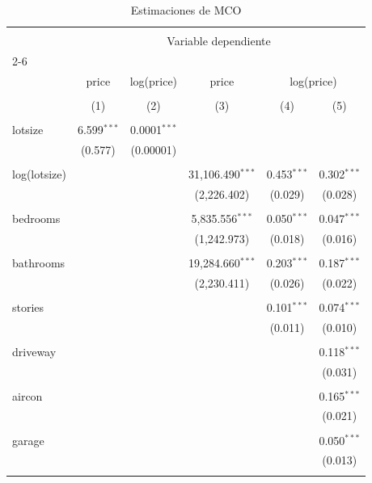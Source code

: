 
\begin{table}[H] \centering 
  \caption{Estimaciones de MCO} 
  \label{tab:tabla2} 
\begin{tabular}{@{\extracolsep{5pt}}lccccc} 
\\[-1.8ex]\hline 
\hline \\[-1.8ex] 
 & \multicolumn{5}{c}{Variable dependiente} \\ 
\cline{2-6} 
\\[-1.8ex] & price & log(price) & price & \multicolumn{2}{c}{log(price)} \\ 
\\[-1.8ex] & (1) & (2) & (3) & (4) & (5)\\ 
\hline \\[-1.8ex] 
 lotsize & 6.599$^{***}$ & 0.0001$^{***}$ &  &  &  \\ 
  & (0.577) & (0.00001) &  &  &  \\ 
  & & & & & \\ 
 log(lotsize) &  &  & 31,106.490$^{***}$ & 0.453$^{***}$ & 0.302$^{***}$ \\ 
  &  &  & (2,226.402) & (0.029) & (0.028) \\ 
  & & & & & \\ 
 bedrooms &  &  & 5,835.556$^{***}$ & 0.050$^{***}$ & 0.047$^{***}$ \\ 
  &  &  & (1,242.973) & (0.018) & (0.016) \\ 
  & & & & & \\ 
 bathrooms &  &  & 19,284.660$^{***}$ & 0.203$^{***}$ & 0.187$^{***}$ \\ 
  &  &  & (2,230.411) & (0.026) & (0.022) \\ 
  & & & & & \\ 
 stories &  &  &  & 0.101$^{***}$ & 0.074$^{***}$ \\ 
  &  &  &  & (0.011) & (0.010) \\ 
  & & & & & \\ 
 driveway &  &  &  &  & 0.118$^{***}$ \\ 
  &  &  &  &  & (0.031) \\ 
  & & & & & \\ 
 aircon &  &  &  &  & 0.165$^{***}$ \\ 
  &  &  &  &  & (0.021) \\ 
  & & & & & \\ 
 garage &  &  &  &  & 0.050$^{***}$ \\ 
  &  &  &  &  & (0.013) \\ 
  & & & & & \\ 

\end{tabular}
\end{table}

